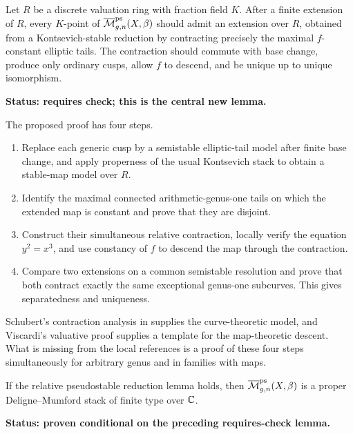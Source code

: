 \documentclass[12pt]{memoir}
\begin{document}
\begin{Lem}
    \label{lem-relative-ps-map-reduction}
    Let \(R\) be a discrete valuation ring with fraction field \(K\).  After a
    finite extension of \(R\), every \(K\)-point of
    \(\overline{\mathcal{M}}^{\operatorname{\mathrm{ps}}}_{g,n}(X,\beta)\) should admit an extension over \(R\),
    obtained from a Kontsevich-stable reduction by contracting precisely the
    maximal \(f\)-constant elliptic tails.  The contraction should commute
    with base change, produce only ordinary cusps, allow \(f\) to descend,
    and be unique up to unique isomorphism.

    \noindent\textbf{Status: requires check; this is the central new lemma.}
\end{Lem}

\begin{ptcbp}
    The proposed proof has four steps.
    \begin{enumerate}
        \item Replace each generic cusp by a semistable elliptic-tail model
        after finite base change, and apply properness of the usual
        Kontsevich stack to obtain a stable-map model over \(R\).
        \item Identify the maximal connected arithmetic-genus-one tails on
        which the extended map is constant and prove that they are disjoint.
        \item Construct their simultaneous relative contraction, locally
        verify the equation \(y^2=x^3\), and use constancy of \(f\) to descend
        the map through the contraction.
        \item Compare two extensions on a common semistable resolution and
        prove that both contract exactly the same exceptional genus-one
        subcurves.  This gives separatedness and uniqueness.
    \end{enumerate}
    Schubert's contraction analysis in
    \cite[Section~4]{SchubertPSModSps} supplies the curve-theoretic model, and
    Viscardi's valuative proof supplies a template for the map-theoretic
    descent.  What is missing from the local references is a proof of these
    four steps simultaneously for arbitrary genus and in families with maps.
\end{ptcbp}

\begin{Cor}
    \label{cor-conditional-ps-map-properness}
    If the relative pseudostable reduction lemma holds, then
    \(\overline{\mathcal{M}}^{\operatorname{\mathrm{ps}}}_{g,n}(X,\beta)\) is a proper Deligne--Mumford stack of
    finite type over \(\mathbb{C}\).

    \noindent\textbf{Status: proven conditional on the preceding
    requires-check lemma.}
\end{Cor}
\end{document}
